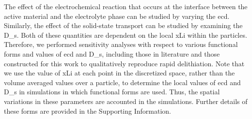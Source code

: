 \documentclass{WileyMSP-template}
\begin{document}
The effect of the electrochemical reaction that occurs at the
interface between the active material and the electrolyte phase can be
studied by varying the \gls{ecd}. Similarly, the effect
of the solid-state transport can be studied by examining the
\gls{D_s}. Both of these quantities are dependent on the
local \gls{xLi} within the particles. Therefore, we
performed sensitivity analyses with respect to various functional
forms and values of \gls{ecd} and \gls{D_s}, including those in
literature\cite{chueh2021,amin2015,moshtev1984,newman1993,newman1994-2,newman1995-2,newman1996,mukherjee2017,chiang2020,tsai2018,dees2008}
and those constructed for this work to qualitatively reproduce rapid
delithiation. Note that we use the value of \gls{xLi} at each point in
the discretized space, rather than the volume averaged values over a
particle, to determine the local values of \gls{ecd} and \gls{D_s} in
simulations in which functional forms are used. Thus, the spatial
variations in these parameters are accounted in the
simulations. Further details of these forms are provided in the
Supporting Information.
\end{document}
